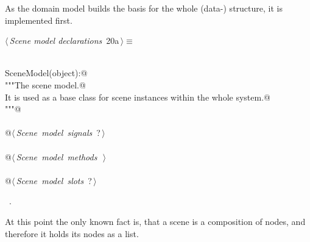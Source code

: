 \documentclass[
    a4paper,      %
    10pt,         %
    openright,    %
    notitlepage,  %
    parskip=half, %
]{scrreprt}       %
\theoremstyle{definition}                    %
\begin{document}
As the domain model builds the basis for the whole (data-) structure, it is
implemented first.

\begin{flushleft} \small
\begin{minipage}{\linewidth}\label{scrap10}\raggedright\small
{} $\langle\,${\itshape Scene model declarations}\nobreak\ {\footnotesize {20a}}$\,\rangle\equiv$
\vspace{-1ex}
\begin{list}{}{} \item
\mbox{}\lstinline@@\\
\mbox{}\lstinline@class SceneModel(object):@\\
\mbox{}\lstinline@    """The scene model.@\\
\mbox{}\lstinline@    It is used as a base class for scene instances within the whole system.@\\
\mbox{}\lstinline@    """@\\
\mbox{}\lstinline@@\\
\mbox{}\lstinline@    @\hbox{$\langle\,${\itshape Scene model signals}\nobreak\ {\footnotesize ?}$\,\rangle$}\lstinline@@\\
\mbox{}\lstinline@@\\
\mbox{}\lstinline@    @\hbox{$\langle\,${\itshape Scene model methods}\nobreak\ {\footnotesize {}}$\,\rangle$}\lstinline@@\\
\mbox{}\lstinline@@\\
\mbox{}\lstinline@    @\hbox{$\langle\,${\itshape Scene model slots}\nobreak\ {\footnotesize ?}$\,\rangle$}\lstinline@@\\
\mbox{}\lstinline@@{\NWsep}
\end{list}
\vspace{-1.5ex}
\footnotesize
\begin{list}{}{\setlength{\itemsep}{-\parsep}\setlength{\itemindent}{-\leftmargin}}
\item \NWtxtMacroRefIn\ .

\item{}
\end{list}
\end{minipage}\vspace{4ex}
\end{flushleft}
At this point the only known fact is, that a scene is a composition of nodes,
and therefore it holds its nodes as a list.
\end{document}
